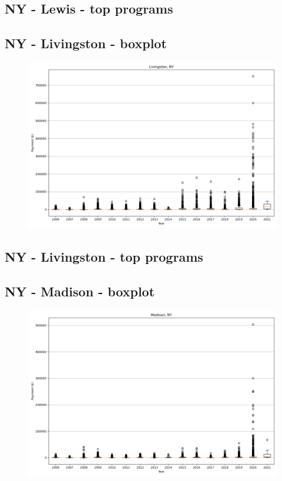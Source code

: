 \subsection*{NY - Lewis - top programs}

\newpage
\subsection*{NY - Livingston - boxplot}
\begin{figure}[h]
\centering
\includegraphics[width=7in]{../output/boxplots/counties/Livingston-NY_boxplot.png}
\end{figure}


\subsection*{NY - Livingston - top programs}

\newpage
\subsection*{NY - Madison - boxplot}
\begin{figure}[h]
\centering
\includegraphics[width=7in]{../output/boxplots/counties/Madison-NY_boxplot.png}
\end{figure}


